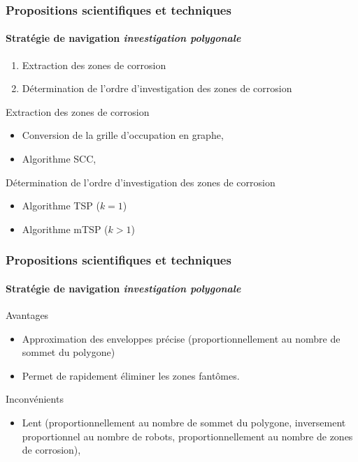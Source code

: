\documentclass{beamer}
\begin{document}
			\begin{frame}
				\frametitle{Propositions scientifiques et techniques}
				\framesubtitle{Stratégie de navigation \textit{investigation polygonale}}
				\begin{enumerate}
					\item Extraction des zones de corrosion
					\item Détermination de l'ordre d'investigation des zones de corrosion
				\end{enumerate}
				\begin{block}{Extraction des zones de corrosion}
					\begin{itemize}
						\item Conversion de la grille d'occupation en graphe,
						\item Algorithme SCC,
					\end{itemize}
				\end{block}
				\begin{block}{Détermination de l'ordre d'investigation des zones de corrosion}
					\begin{itemize}
						\item Algorithme TSP ($k = 1$)
						\item Algorithme mTSP ($k > 1$)
					\end{itemize}
				\end{block}
			\end{frame}
			\begin{frame}
				\frametitle{Propositions scientifiques et techniques}
				\framesubtitle{Stratégie de navigation \textit{investigation polygonale}}
				\begin{exampleblock}{Avantages}
					\begin{itemize}
						\item Approximation des enveloppes précise (proportionnellement au nombre de sommet du polygone)
						\item Permet de rapidement éliminer les zones fantômes.
					\end{itemize}
				\end{exampleblock}
				\begin{alertblock}{Inconvénients}
					\begin{itemize}
						\item Lent (proportionnellement au nombre de sommet du polygone, inversement proportionnel au nombre de robots, proportionnellement au nombre de zones de corrosion),
					\end{itemize}
				\end{alertblock}
			\end{frame}
\end{document}

